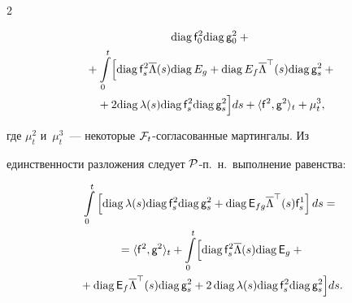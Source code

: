 \begin{multicols}{2}
{\begin{multline*}
        \mathrm{diag}\, \mathsf{f}_0^2  \mathrm{diag}\, \mathsf{g}_0^2 + {}\\


        {} + \int\limits_0^t


    \Bigl[ \mathrm{diag}\, \mathsf{f}_{s}^2 \overline{\Lambda}(s) \mathrm{diag}\, E_g +


    \mathrm{diag}\, E_f \overline{\Lambda}^{\top}(s) \mathrm{diag}\, \mathsf{g}_{s}^2 +{}\\


    {}+


    2 \mathrm{diag}\, \lambda(s) \mathrm{diag}\, \mathsf{f}^2_s \mathrm{diag}\, \mathsf{g}^2_s


    \Bigl]ds +   \langle \mathsf{f}^2, \mathsf{g}^2\rangle_t + \mu_t^3,




   \end{multline*}


   где $\mu_t^2$ и~$\mu_t^3$~--- некоторые ${\mathcal F}_t$-согласованные мартингалы. Из 


единственности разложения следует ${\mathcal P}$-п.~н.\ выполнение равенства:


       \begin{multline*}


   \int\limits_0^t


   \left[


   \mathrm{diag}\, \lambda(s) \mathrm{diag}\, \mathsf{f}^2_s \mathrm{diag}\, \mathsf{g}^2_s + \mathrm{diag}\,{\mathsf E}_{fg} 


\overline{\Lambda}^{\top}(s) \mathsf{f}^1_s


   \right]ds = {}\\


   {}=  \langle \mathsf{f}^2, \mathsf{g}^2\rangle_t +


   \int\limits_0^t


    \Bigl[ \mathrm{diag}\,\mathsf{f}_{s}^2 \overline{\Lambda}(s) \mathrm{diag}\,{\mathsf E}_g +{}\\


    {}+


    \mathrm{diag}\,{\mathsf E}_f \overline{\Lambda}^{\top}(s)\mathrm{diag}\, \mathsf{g}_{s}^2 +


    2\,\mathrm{diag}\, \lambda(s) \mathrm{diag}\,\mathsf{f}^2_s \mathrm{diag}\, \mathsf{g}^2_s


    \Bigl]ds.


   \end{multline*}


}
\end{multicols}
